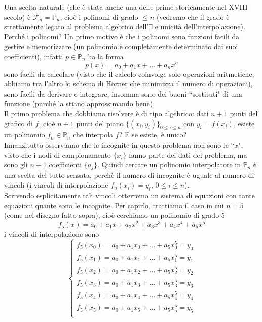 \documentclass[12pt,headings=optiontohead]{article}
\begin{document}
Una scelta naturale (che è stata anche una delle prime storicamente nel XVIII secolo) è $\mathcal{F}_n = \mathbb{P}_n$, cioè i polinomi di grado $\leq n$ (vedremo che il grado è strettamente legato al problema algebrico dell'$\exists$ e unicità dell'interpolazione).\\
Perché i polinomi? Un primo motivo è che i polinomi sono funzioni facili da gestire e memorizzare (un polinomio è completamente determinato dai suoi coefficienti), infatti $p \in \mathbb{P}_n$ ha la forma 
\[ p(x) = a_0 + a_1x + \dotso + a_n x^n \]
sono facili da calcolare (visto che il calcolo coinvolge solo operazioni aritmetiche, abbiamo tra l'altro lo schema di H{\"o}rner che minimizza il numero di operazioni), sono facili da derivare e integrare, insomma sono dei buoni ``sostituti" di una funzione (purché la stiano approssimando bene). \\
Il primo problema che dobbiamo risolvere è di tipo algebrico: dati $n+1$ punti del grafico di $f$, cioè $n+1$ punti del piano $\{(x_i,y_i)\}_{0\leq i\leq n}$ con $y_i=f(x_i)$, esiste un polinomio $f_n\in\mathbb{P}_n$ che interpola $f$? E se esiste, è unico?\\ Innanzitutto osserviamo che le incognite in questo problema non sono le ``$x$", visto che i nodi di campionamento $\{x_i\}$ fanno parte dei dati del problema, ma sono gli $n+1$ coefficienti $\{a_j\}$. Quindi cercare un polinomio interpolatore in $\mathbb{P}_n$ è una scelta del tutto sensata, perchè il numero di incognite è uguale al numero di vincoli (i vincoli di interpolazione $f_n(x_i)=y_i$, $0\leq i\leq n$).\\Scrivendo esplicitamente tali vincoli otterremo un sistema di equazioni con tante equazioni quante sono le incognite. Per capirlo, trattiamo il caso in cui $n=5$ (come nel disegno fatto sopra), cioè cerchiamo un polinomio di grado 5
\[ f_5(x)=a_0+a_1x+a_2x^2+a_3x^3+a_4x^4+a_5x^5 \]
i vincoli di interpolazione sono 
\[ \begin{cases}
    f_5(x_0)=a_0+a_1x_0+\dotso+a_5x_0^5=y_0\\
    f_5(x_1)=a_0+a_1x_1+\dotso+a_5x_1^5=y_1\\
    f_5(x_2)=a_0+a_1x_2+\dotso+a_5x_2^5=y_2\\
    f_5(x_3)=a_0+a_1x_3+\dotso+a_5x_3^5=y_3\\
    f_5(x_4)=a_0+a_1x_4+\dotso+a_5x_4^5=y_4\\
    f_5(x_5)=a_0+a_1x_5+\dotso+a_5x_5^5=y_5\\
\end{cases} \]
\end{document}
